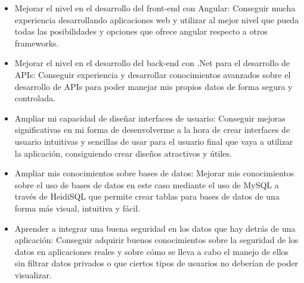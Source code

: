 \begin{itemize}
\tightlist
\item
Mejorar el nivel en el desarrollo del front-end con Angular: Conseguir mucha experiencia desarrollando aplicaciones web y utilizar al mejor nivel que pueda todas las posibilidades y opciones que ofrece angular respecto a otros frameworks.

\item
Mejorar el nivel en el desarrollo del back-end con .Net para el desarrollo de APIs: Conseguir experiencia y desarrollar conocimientos avanzados sobre el desarrollo de APIs para poder manejar mis propios datos de forma segura y controlada.

\item
Ampliar mi capacidad de diseñar interfaces de usuario: Conseguir mejoras significativas en mi forma de desenvolverme a la hora de crear interfaces de usuario intuitivas y sencillas de usar para el usuario final que vaya a utilizar la aplicación, consiguiendo crear diseños atractivos y útiles.

\item
Ampliar mis conocimientos sobre bases de datos: Mejorar mis conocimientos sobre el uso de bases de datos en este caso mediante el uso de MySQL a través de HeidiSQL que permite crear tablas para bases de datos de una forma más visual, intuitiva y fácil.

\item
Aprender a integrar una buena seguridad en los datos que hay detrás de una aplicación: Conseguir adquirir buenos conocimientos sobre la seguridad de los datos en aplicaciones reales y sobre cómo se lleva a cabo el manejo de ellos sin filtrar datos privados o que ciertos tipos de usuarios no deberían de poder visualizar.
\end{itemize}